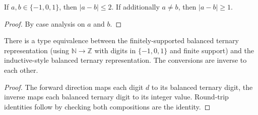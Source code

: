 \begin{lemma}
\label{lem.fps.laure.bt-diff-abs}
\leanhelper
\leanok
If $a, b \in \{-1, 0, 1\}$, then $|a - b| \le 2$.
If additionally $a \ne b$, then $|a - b| \ge 1$.
\end{lemma}

\begin{proof}
\leanok
By case analysis on $a$ and $b$.
\end{proof}

\begin{lemma}
\label{lem.fps.laure.bt-equiv}
\leanhelper
\leanok
There is a type equivalence between the finitely-supported
balanced ternary representation (using $\mathbb{N} \to \mathbb{Z}$
with digits in $\{-1,0,1\}$ and finite support) and the inductive-style
balanced ternary representation. The conversions are inverse
to each other.
\end{lemma}

\begin{proof}
The forward direction maps each digit $d$ to its balanced ternary digit,
the inverse maps each balanced ternary digit to its integer value.
Round-trip identities follow by checking both compositions are the identity.
\end{proof}
